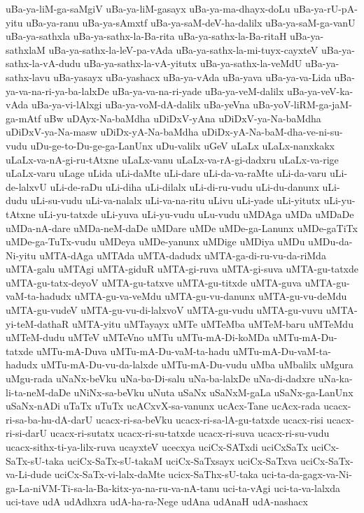 {uBa-ya-liM-ga-saMgiV
uBa-ya-liM-gasayx
uBa-ya-ma-dhayx-doLu
uBa-ya-rU-pA-yitu
uBa-ya-ranu
uBa-ya-sAmxtf
uBa-ya-saM-deV-ha-dalilx
uBa-ya-saM-ga-vanU
uBa-ya-sathxla
uBa-ya-sathx-la-Ba-rita
uBa-ya-sathx-la-Ba-ritaH
uBa-ya-sathxlaM
uBa-ya-sathx-la-leV-pa-vAda
uBa-ya-sathx-la-mi-tuyx-cayxteV
uBa-ya-sathx-la-vA-dudu
uBa-ya-sathx-la-vA-yitutx
uBa-ya-sathx-la-veMdU
uBa-ya-sathx-lavu
uBa-yasayx
uBa-yashacx
uBa-ya-vAda
uBa-yava
uBa-ya-va-Lida
uBa-ya-va-na-ri-ya-ba-lalxDe
uBa-ya-va-na-ri-yade
uBa-ya-veM-dalilx
uBa-ya-veV-ka-vAda
uBa-ya-vi-lAlxgi
uBa-ya-voM-dA-dalilx
uBa-yeVna
uBa-yoV-liRM-ga-jaM-ga-mAtf
uBw
uDAyx-Na-baMdha
uDiDxV-yAna
uDiDxV-ya-Na-baMdha
uDiDxV-ya-Na-masw
uDiDx-yA-Na-baMdha
uDiDx-yA-Na-baM-dha-ve-ni-su-vudu
uDu-ge-to-Du-ge-ga-LanUnx
uDu-valilx
uGeV
uLaLx
uLaLx-nanxkakx
uLaLx-va-nA-gi-ru-tAtxne
uLaLx-vanu
uLaLx-va-rA-gi-dadxru
uLaLx-va-rige
uLaLx-varu
uLage
uLida
uLi-daMte
uLi-dare
uLi-da-va-raMte
uLi-da-varu
uLi-de-lalxvU
uLi-de-raDu
uLi-diha
uLi-dilalx
uLi-di-ru-vudu
uLi-du-danunx
uLi-dudu
uLi-su-vudu
uLi-va-nalalx
uLi-va-na-ritu
uLivu
uLi-yade
uLi-yitutx
uLi-yu-tAtxne
uLi-yu-tatxde
uLi-yuva
uLi-yu-vudu
uLu-vudu
uMDAga
uMDa
uMDaDe
uMDa-nA-dare
uMDa-neM-daDe
uMDare
uMDe
uMDe-ga-Lanunx
uMDe-gaTiTx
uMDe-ga-TuTx-vudu
uMDeya
uMDe-yanunx
uMDige
uMDiya
uMDu
uMDu-da-Ni-yitu
uMTA-dAga
uMTAda
uMTA-dadudx
uMTA-ga-di-ru-vu-da-riMda
uMTA-galu
uMTAgi
uMTA-giduR
uMTA-gi-ruva
uMTA-gi-suva
uMTA-gu-tatxde
uMTA-gu-tatx-deyoV
uMTA-gu-tatxve
uMTA-gu-titxde
uMTA-guva
uMTA-gu-vaM-ta-hadudx
uMTA-gu-va-veMdu
uMTA-gu-vu-danunx
uMTA-gu-vu-deMdu
uMTA-gu-vudeV
uMTA-gu-vu-di-lalxvoV
uMTA-gu-vudu
uMTA-gu-vuvu
uMTA-yi-teM-dathaR
uMTA-yitu
uMTayayx
uMTe
uMTeMba
uMTeM-baru
uMTeMdu
uMTeM-dudu
uMTeV
uMTeVno
uMTu
uMTu-mA-Di-koMDa
uMTu-mA-Du-tatxde
uMTu-mA-Duva
uMTu-mA-Du-vaM-ta-hadu
uMTu-mA-Du-vaM-ta-hadudx
uMTu-mA-Du-vu-da-lalxde
uMTu-mA-Du-vudu
uMba
uMbalilx
uMgura
uMgu-rada
uNaNx-beVku
uNa-ba-Di-salu
uNa-ba-lalxDe
uNa-di-dadxre
uNa-ka-li-ta-neM-daDe
uNiNx-sa-beVku
uNuta
uSaNx
uSaNxM-gaLa
uSaNx-ga-LanUnx
uSaNx-nADi
uTaTx
uTuTx
ucACxvX-sa-vanunx
ucAcx-Tane
ucAcx-rada
ucacx-ri-sa-ba-hu-dA-darU
ucacx-ri-sa-beVku
ucacx-ri-sa-lA-gu-tatxde
ucacx-risi
ucacx-ri-si-darU
ucacx-ri-sutatx
ucacx-ri-su-tatxde
ucacx-ri-suva
ucacx-ri-su-vudu
ucacx-sithx-ti-ya-lilx-ruva
ucayxteV
ucecxya
uciCx-SATxdi
uciCxSaTx
uciCx-SaTx-sU-taka
uciCx-SaTx-sU-takaM
uciCx-SaTxsayx
uciCx-SaTxva
uciCx-SaTx-va-Li-dude
uciCx-SaTx-vi-lalx-daMte
ucicx-SaThx-sU-taka
uci-ta-da-gagx-va-Ni-ga-La-niVM-Ti-sa-la-Ba-kitx-ya-na-ru-va-nA-tanu
uci-ta-vAgi
uci-ta-va-lalxda
uci-tave
udA
udAdhxra
udA-ha-ra-Nege
udAna
udAnaH
udA-nashacx
}
